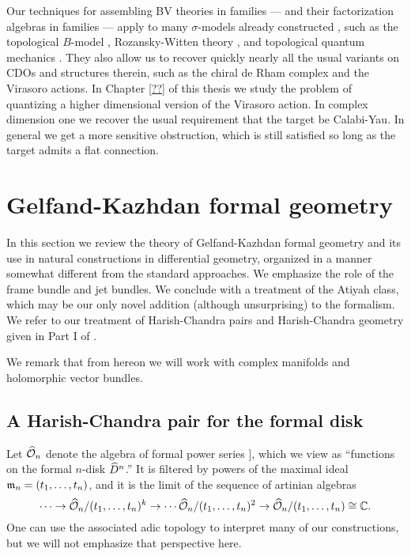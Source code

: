 Our techniques for assembling BV theories in families --- and their factorization algebras in families --- apply to many $\sigma$-models already constructed , such as the topological $B$-model \cite{LiLi}, Rozansky-Witten theory \cite{CLL}, and topological quantum mechanics \cite{GG1, GLL}. 
They also allow us to recover quickly nearly all the usual variants on CDOs and structures therein, such as the chiral de Rham complex and the Virasoro actions.
In Chapter \ref{??} of this thesis we study the problem of quantizing a higher dimensional version of the Virasoro action. 
In complex dimension one we recover the usual requirement that the target be Calabi-Yau. 
In general we get a more sensitive obstruction, which is still satisfied so long as the target admits a flat connection.



\section{Gelfand-Kazhdan formal geometry}

In this section we review the theory of Gelfand-Kazhdan formal geometry and its use in natural constructions in differential geometry, organized in a manner somewhat different from the standard approaches.
We emphasize the role of the frame bundle and jet bundles.
We conclude with a treatment of the Atiyah class, which may be our only novel addition (although unsurprising) to the formalism.
We refer to our treatment of Harish-Chandra pairs and Harish-Chandra geometry given in Part I of \cite{GGW}.

We remark that from hereon we will work with complex manifolds and holomorphic vector bundles.
 
\subsection{A Harish-Chandra pair for the formal disk}

Let $\widehat{\mathcal O}_n$ denote the algebra of formal power series 
\ben
\CC [[ t_1,\ldots,t_n ]],
\een 
which we view as ``functions on the formal $n$-disk $\widehat{D}^n$.'' 
It is filtered by powers of the maximal ideal ${\mathfrak m}_n = (t_1,\ldots,t_n)$, and it is the limit of the sequence of artinian algebras
\[
\cdots \to \widehat{\mathcal O}_n/(t_1,\ldots,t_n)^k \to \cdots \widehat{\mathcal O}_n/(t_1,\ldots,t_n)^2 \to \widehat{\mathcal O}_n/(t_1,\ldots,t_n) \cong \mathbb C.
\] 
One can use the associated adic topology to interpret many of our constructions, but we will not emphasize that perspective here.

